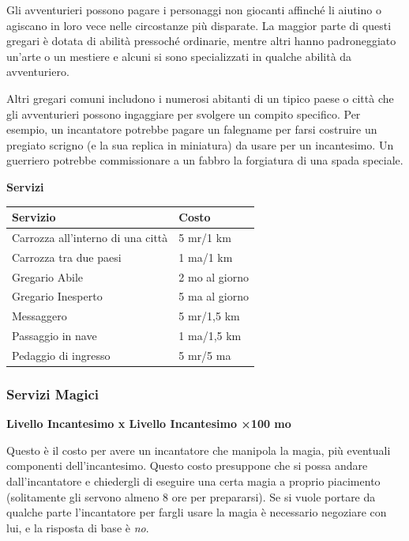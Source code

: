 \begin{multicols}{2}
\medskip

Gli avventurieri possono pagare i personaggi non giocanti affinché li aiutino o agiscano in loro vece nelle circostanze più disparate. La maggior parte di questi gregari è dotata di abilità pressoché ordinarie, mentre altri hanno padroneggiato un'arte o un mestiere e alcuni si sono specializzati in qualche abilità da avventuriero.

Altri gregari comuni includono i numerosi abitanti di un tipico paese o città che gli avventurieri possono ingaggiare per svolgere un compito specifico. Per esempio, un incantatore potrebbe pagare un falegname per farsi costruire un pregiato scrigno (e la sua replica in miniatura) da usare per un incantesimo.
Un guerriero potrebbe commissionare a un fabbro la forgiatura di una spada speciale.

\medskip

\textbf{Servizi}

\bigskip

\noindent\begin{tabularx}{\linewidth}{Xl}
	\toprule
\rowcolor{gray!20}\textbf{Servizio}&\textbf{Costo}\\
\toprule
Carrozza all'interno di una città&5 mr/1 km\\
\rowcolor{gray!20}Carrozza tra due paesi&1 ma/1 km\\
Gregario Abile&2 mo al giorno\\
\rowcolor{gray!20}Gregario Inesperto&5 ma al giorno\\
Messaggero&5 mr/1,5 km\\
\rowcolor{gray!20}Passaggio in nave&1 ma/1,5 km\\
Pedaggio di ingresso&5 mr/5 ma
\end{tabularx}

\subsubsection{Servizi Magici}

\textbf{Livello Incantesimo x Livello Incantesimo ×100 mo}

Questo è il costo per avere un incantatore che manipola la magia, più eventuali componenti dell'incantesimo. Questo costo presuppone che si possa andare dall'incantatore e chiedergli di eseguire una certa magia a proprio piacimento (solitamente gli servono almeno 8 ore per prepararsi). Se si vuole portare da qualche parte l'incantatore per fargli usare la magia è necessario negoziare con lui, e la risposta di base è \emph{no}.


\end{multicols}
